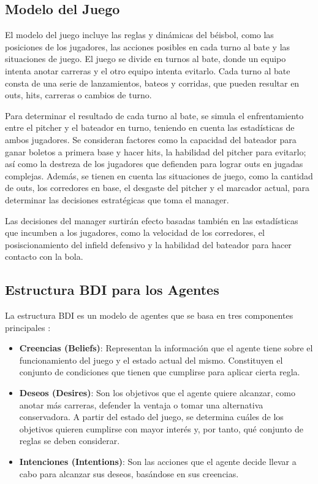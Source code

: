 \documentclass[runningheads]{llncs}
\begin{document}
    \subsection{Modelo del Juego}
        El modelo del juego incluye las reglas y dinámicas del béisbol, como las posiciones de los jugadores, las acciones posibles en cada turno al bate y las situaciones de juego. El juego se divide en turnos al bate, donde un equipo intenta anotar carreras y el otro equipo intenta evitarlo. Cada turno al bate consta de una serie de lanzamientos, bateos y corridas, que pueden resultar en outs, hits, carreras o cambios de turno. 

        Para determinar el resultado de cada turno al bate, se simula el enfrentamiento entre el pitcher y el bateador en turno, teniendo en cuenta las estadísticas de ambos jugadores. Se consideran factores como la capacidad del bateador para ganar boletos a primera base y hacer hits, la habilidad del pitcher para evitarlo; así como la destreza de los jugadores que defienden para lograr outs en jugadas complejas. Además, se tienen en cuenta las situaciones de juego, como la cantidad de outs, los corredores en base, el desgaste del pitcher y el marcador actual, para determinar las decisiones estratégicas que toma el manager. 

        Las decisiones del manager surtirán efecto basadas también en las estadísticas que incumben a los jugadores, como la velocidad de los corredores, el posiscionamiento del infield defensivo y la habilidad del bateador para hacer contacto con la bola.

    \subsection{Estructura BDI para los Agentes}
        La estructura BDI es un modelo de agentes que se basa en tres componentes principales \cite{rao1995bdi}:
        \begin{itemize}
            \item \textbf{Creencias (Beliefs)}: Representan la información que el agente tiene sobre el funcionamiento del juego y el estado actual del mismo. Constituyen el conjunto de condiciones que tienen que cumplirse para aplicar cierta regla.
            \item \textbf{Deseos (Desires)}: Son los objetivos que el agente quiere alcanzar, como anotar más carreras, defender la ventaja o tomar una alternativa conservadora. A partir del estado del juego, se determina cuáles de los objetivos quieren cumplirse con mayor interés y, por tanto, qué conjunto de reglas se deben considerar.
            \item \textbf{Intenciones (Intentions)}: Son las acciones que el agente decide llevar a cabo para alcanzar sus deseos, basándose en sus creencias.
        \end{itemize}
\end{document}
